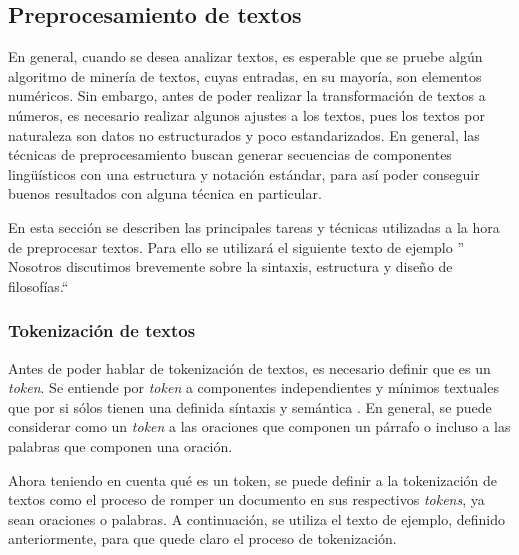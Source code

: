 \subsection{Preprocesamiento de textos}
    En general, cuando se desea analizar textos, es esperable que se pruebe algún algoritmo de minería de textos, cuyas entradas, en su mayoría, son elementos numéricos. Sin embargo, antes de poder realizar la transformación de textos a números, es necesario realizar algunos ajustes a los textos, pues los textos por naturaleza son datos no estructurados y poco estandarizados. En general, las técnicas de preprocesamiento buscan generar secuencias de componentes lingüísticos con una estructura y notación estándar, para así poder conseguir buenos resultados con alguna técnica en particular.
    
    En esta sección se describen las principales tareas y técnicas utilizadas a la hora de preprocesar textos. Para ello se utilizará el siguiente texto de ejemplo '' Nosotros discutimos brevemente sobre la sintaxis, estructura y diseño de filosofías.``    
\subsubsection{Tokenización de textos}
    Antes de poder hablar de tokenización de textos, es necesario definir que es un \textit{token}. Se entiende por \textit{token} a componentes independientes y mínimos textuales que por si sólos tienen una definida síntaxis y semántica \cite{sarkar2016text}. En general, se puede considerar como un \textit{token} a las oraciones que componen un párrafo o incluso a las palabras que componen una oración. 
    
    Ahora teniendo en cuenta qué es un token, se puede definir a la tokenización de textos como el proceso de romper un documento en sus respectivos \textit{tokens}, ya sean oraciones o palabras. A continuación, se utiliza el texto de ejemplo, definido anteriormente, para que quede claro el proceso de tokenización.
    
